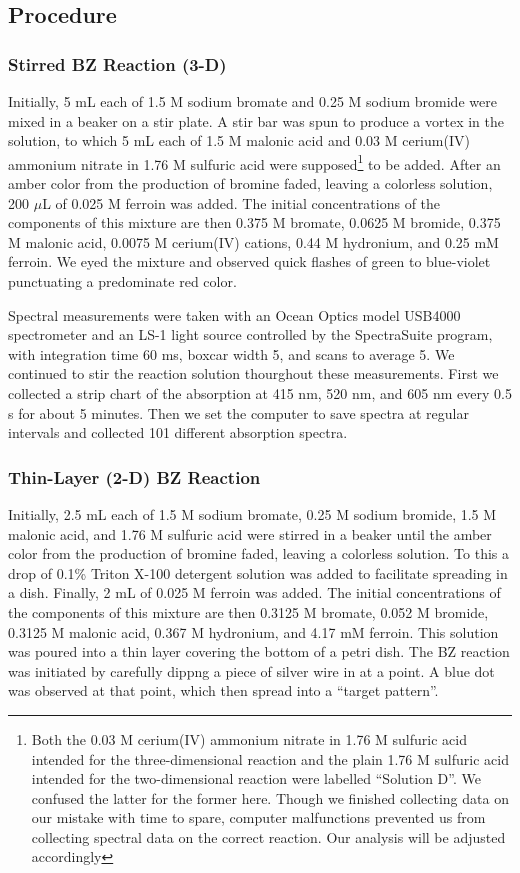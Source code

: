 \documentclass{article}
\begin{document}
\subsection{Procedure}

\subsubsection{Stirred BZ Reaction (3-D)}

Initially, 5 mL each of 1.5 M sodium bromate and 0.25 M sodium bromide were mixed in a 
beaker on a stir plate. A stir bar was spun to produce a vortex in the solution, to which
5 mL each of 1.5 M malonic acid and 0.03 M cerium(IV) ammonium nitrate in 1.76 M sulfuric 
acid were
supposed\footnote{Both the 0.03 M cerium(IV) ammonium nitrate in 1.76 M 
sulfuric acid intended for the three-dimensional reaction and the plain 1.76 M sulfuric acid
intended for the two-dimensional reaction were labelled ``Solution D''. We confused the 
latter for the former here. Though we finished collecting data on our mistake with time to 
spare, computer malfunctions prevented us from collecting spectral data on the correct 
reaction. Our analysis will be adjusted accordingly}
to be added. After an amber color from the production of bromine faded, leaving a colorless 
solution, 200 $\mu$L of 0.025 M ferroin was added.
The initial concentrations of the components of this mixture are then 0.375 M 
bromate, 0.0625 M bromide, 0.375 M malonic acid, 0.0075 M cerium(IV) cations, 0.44 M 
hydronium, and 0.25 mM ferroin.
We eyed the mixture and observed quick 
flashes of green to blue-violet punctuating a predominate red color.

Spectral measurements were taken with an Ocean Optics model USB4000 spectrometer and
an LS-1 light source controlled by the SpectraSuite program, with integration time 60 ms, 
boxcar width 5, and scans to average 5. We continued to stir the reaction solution 
thourghout these measurements. First we collected a strip chart of the absorption at
415 nm, 520 nm, and 605 nm every 0.5 s for about 5 minutes. Then we set the computer
to save spectra at regular intervals and collected 101 different absorption spectra.

\subsubsection{Thin-Layer (2-D) BZ Reaction}

Initially, 2.5 mL each of 1.5 M sodium bromate, 0.25 M sodium bromide, 1.5 M malonic acid,
and 1.76 M sulfuric acid were stirred in a beaker until the amber color from the production of 
bromine faded, leaving a colorless solution. To this a drop of 0.1\% Triton X-100 detergent
solution was added to facilitate spreading in a dish. Finally, 2 mL of 0.025 M ferroin was 
added. The initial concentrations of the components of this mixture are then 0.3125 M 
bromate, 0.052 M bromide, 0.3125 M malonic acid, 0.367 M hydronium, and 4.17 mM ferroin.
This solution was poured into a thin layer covering the bottom of a petri dish. The
BZ reaction was initiated by carefully dippng a piece of silver wire in at a point. A blue dot
was observed at that point, which then spread into a ``target pattern''.
\end{document}
